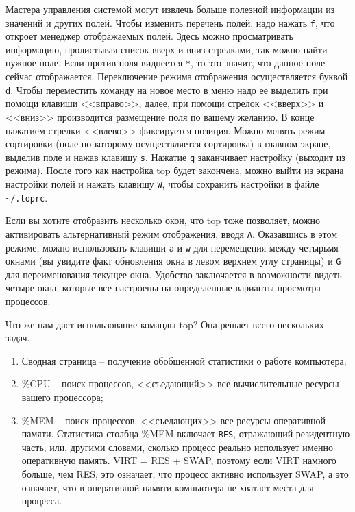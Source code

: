 \documentclass[a4paper,12pt,final,openany]{extbook}
\providecommand{\tightlist}{%
  \setlength{\itemsep}{0pt}\setlength{\parskip}{0pt}}
\begin{document}
Мастера управления системой могут извлечь больше полезной информации из
значений и других полей. Чтобы изменить перечень полей, надо нажать
\texttt{f}, что откроет менеджер отображаемых полей. Здесь можно
просматривать информацию, пролистывая список вверх и вниз стрелками, так
можно найти нужное поле. Если против поля виднеется \texttt{*}, то это
значит, что данное поле сейчас отображается. Переключение режима отображения осуществляется буквой \texttt{d}. Чтобы переместить команду
на новое место в меню надо ее выделить при помощи клавиши <<вправо>>,
далее, при помощи стрелок <<вверх>> и <<вниз>> производится размещение поля
по вашему желанию. В конце нажатием стрелки <<влево>> фиксируется позиция.
Можно менять режим сортировки (поле по которому осуществляется
сортировка) в главном экране, выделив поле и нажав клавишу \texttt{s}.
Нажатие \texttt{q} заканчивает настройку (выходит из режима). После того как настройка top
будет закончена, можно выйти из экрана настройки полей и нажать клавишу
\texttt{W}, чтобы сохранить настройки в файле
\texttt{\textasciitilde{}/.toprc}.

Если вы хотите отобразить несколько окон, что top тоже позволяет, можно
активировать альтернативный режим отображения, вводя \texttt{A}.
Оказавшись в этом режиме, можно использовать клавиши \texttt{a} и
\texttt{w} для перемещения между четырьмя окнами (вы увидите факт
обновления окна в левом верхнем углу страницы) и \texttt{G} для
переименования текущее окна. Удобство заключается в возможности видеть
четыре окна, которые все настроены на определенные варианты просмотра
процессов.

Что же нам дает использование команды top? Она решает всего нескольких
задач.
\begin{enumerate}
\tightlist
\item
  Сводная страница -- получение обобщенной статистики о работе компьютера;
\item
  \%CPU -- поиск процессов, <<съедающий>> все вычислительные ресурсы вашего
  процессора;
\item
  \%MEM -- поиск процессов, <<съедающих>> все ресурсы оперативной памяти.
  Статистика столбца \%MEM включает \texttt{RES}, отражающий резидентную
  часть, или, другими словами, сколько процесс реально использует
  именно оперативную память. VIRT = RES + SWAP, поэтому если VIRT
  намного больше, чем RES, это означает, что процесс активно использует
  SWAP, а это означает, что в оперативной памяти компьютера не хватает
  места для процесса.
\end{enumerate}
\end{document}
